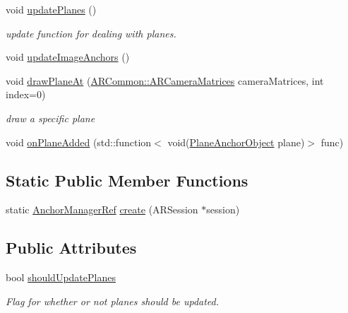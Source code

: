 \begin{DoxyCompactItemize}
void \mbox{\hyperlink{class_a_r_core_1_1_a_r_anchor_manager_aa35c3487e0ba5980ff6b2fb43414bd57}{update\+Planes}} ()
\begin{DoxyCompactList}\small\item\em update function for dealing with planes. \end{DoxyCompactList}\item 
void \mbox{\hyperlink{class_a_r_core_1_1_a_r_anchor_manager_a6b5fc9e3d6e318fb1be3a7cc4e867b16}{update\+Image\+Anchors}} ()
\item 
void \mbox{\hyperlink{class_a_r_core_1_1_a_r_anchor_manager_a68742132d494088fcf6be20c776ca0c6}{draw\+Plane\+At}} (\mbox{\hyperlink{struct_a_r_common_1_1_a_r_camera_matrices}{A\+R\+Common\+::\+A\+R\+Camera\+Matrices}} camera\+Matrices, int index=0)
\begin{DoxyCompactList}\small\item\em draw a specific plane \end{DoxyCompactList}\item 
void \mbox{\hyperlink{class_a_r_core_1_1_a_r_anchor_manager_a1823c29c5b2d0d407e66b98378bf8c5f}{on\+Plane\+Added}} (std\+::function$<$ void(\mbox{\hyperlink{struct_a_r_objects_1_1_plane_anchor_object}{Plane\+Anchor\+Object}} plane)$>$ func)
\end{DoxyCompactItemize}
\subsection*{Static Public Member Functions}
\begin{DoxyCompactItemize}
\item 
static \mbox{\hyperlink{namespace_a_r_core_a3f2b9ba00b51ce19c1010f554a66a512}{Anchor\+Manager\+Ref}} \mbox{\hyperlink{class_a_r_core_1_1_a_r_anchor_manager_ab1293c2f5911e273573b1df3643fd086}{create}} (A\+R\+Session $\ast$session)
\end{DoxyCompactItemize}
\subsection*{Public Attributes}
\begin{DoxyCompactItemize}
\item 
bool \mbox{\hyperlink{class_a_r_core_1_1_a_r_anchor_manager_af67de0a611ff8a2786891eabb0ca571f}{should\+Update\+Planes}}
\begin{DoxyCompactList}\small\item\em Flag for whether or not planes should be updated. \end{DoxyCompactList}\end{DoxyCompactItemize}


